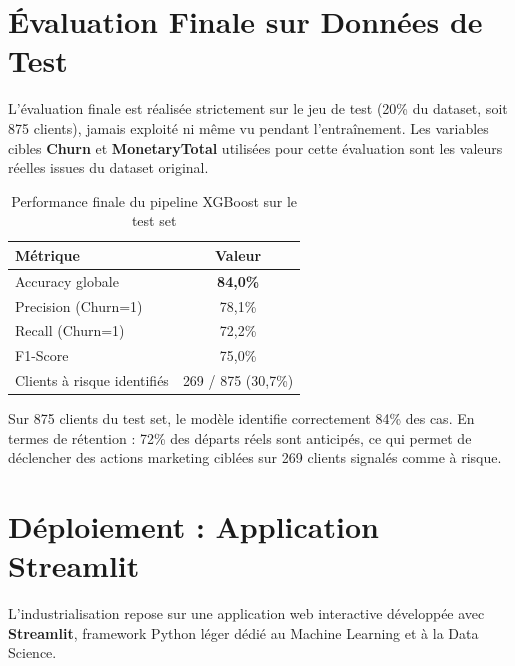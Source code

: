 \documentclass[11pt,a4paper]{article}
\begin{document}
\section{Évaluation Finale sur Données de Test}

L'évaluation finale est réalisée strictement sur le jeu de test (20\% du dataset, soit 875 clients), jamais exploité ni même vu pendant l'entraînement. Les variables cibles \textbf{Churn} et \textbf{MonetaryTotal} utilisées pour cette évaluation sont les valeurs réelles issues du dataset original.

\begin{table}[H]
\centering
{}
\begin{tabular}{|l|c|}
\hline
\textbf{Métrique} & \textbf{Valeur} \\ \hline
Accuracy globale & \textbf{84,0\%} \\
Precision (Churn=1) & 78,1\% \\
Recall (Churn=1) & 72,2\% \\
F1-Score & 75,0\% \\
Clients à risque identifiés & 269 / 875 (30,7\%) \\ \hline
\end{tabular}
\caption{Performance finale du pipeline XGBoost sur le test set}
\end{table}

\begin{tcolorbox}[colframe=successgreen, title=Interprétation métier]
Sur 875 clients du test set, le modèle identifie correctement 84\% des cas. En termes de rétention : 72\% des départs réels sont anticipés, ce qui permet de déclencher des actions marketing ciblées sur 269 clients signalés comme à risque.
\end{tcolorbox}

\section{Déploiement : Application Streamlit}

L'industrialisation repose sur une application web interactive développée avec \textbf{Streamlit}, framework Python léger dédié au Machine Learning et à la Data Science.
\end{document}
